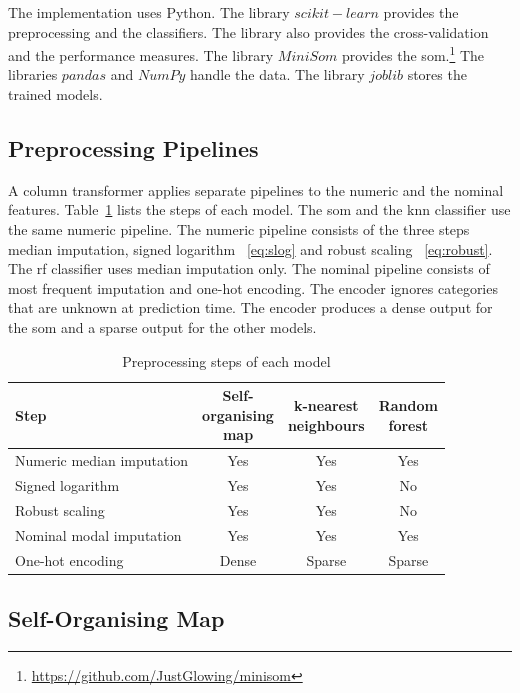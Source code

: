\documentclass[conference]{IEEEtran}
\begin{document}
The implementation uses Python.
The library $scikit-learn$ provides the preprocessing and the classifiers.
The library also provides the cross-validation and the performance measures.
The library $MiniSom$ provides the \gls{som}.\footnote{\url{https://github.com/JustGlowing/minisom}}
The libraries $pandas$ and $NumPy$ handle the data.
The library $joblib$ stores the trained models.

\subsection{Preprocessing Pipelines}
\label{sub:pipeline}

A column transformer applies separate pipelines to the numeric and the nominal features.
Table~\ref{tab:pipeline} lists the steps of each model.
The \gls{som} and the \gls{knn} classifier use the same numeric pipeline.
The numeric pipeline consists of the three steps median imputation, signed logarithm ~\eqref{eq:slog} and
robust scaling ~\eqref{eq:robust}.
The \gls{rf} classifier uses median imputation only.
The nominal pipeline consists of most frequent imputation and one-hot encoding.
The encoder ignores categories that are unknown at prediction time.
The encoder produces a dense output for the \gls{som} and a sparse output for the other models.

\begin{table}[H]
\centering
\caption{Preprocessing steps of each model}
\label{tab:pipeline}
\footnotesize
\setlength{\tabcolsep}{3pt}
\begin{tabular}{lccc}
\toprule
\textbf{Step} & \shortstack{\textbf{Self-}\\\textbf{organising}\\\textbf{map}} & \shortstack{\textbf{k-nearest}\\\textbf{neighbours}} & \shortstack{\textbf{Random}\\\textbf{forest}} \\
\midrule
Numeric median imputation & Yes & Yes & Yes \\
Signed logarithm & Yes & Yes & No \\
Robust scaling & Yes & Yes & No \\
Nominal modal imputation & Yes & Yes & Yes \\
One-hot encoding & Dense & Sparse & Sparse \\
\bottomrule
\end{tabular}
\end{table}

\subsection{Self-Organising Map}
\label{sub:somimpl}
\end{document}
